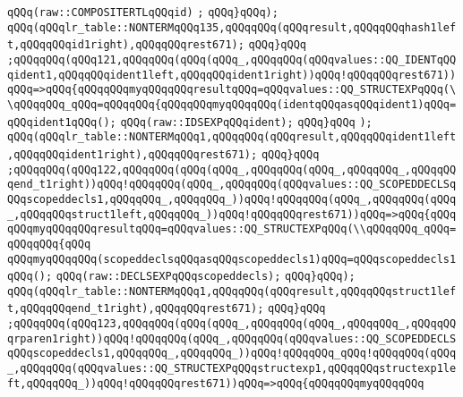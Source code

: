\verb|qQQq(raw::COMPOSITERTLqQQqid)|\newline
\verb|;|\newline
\verb|qQQq}qQQq);|\newline
\verb|qQQq(qQQqlr_table::NONTERMqQQq135,qQQqqQQq(qQQqresult,qQQqqQQqhash1left,qQQqqQQqid1right),qQQqqQQqrest671);|\newline
\verb|qQQq}qQQq|\newline
\verb|;qQQqqQQq(qQQq121,qQQqqQQq(qQQq(qQQq_,qQQqqQQq(qQQqvalues::QQ_IDENTqQQqident1,qQQqqQQqident1left,qQQqqQQqident1right))qQQq!qQQqqQQqrest671))qQQq=>qQQq{qQQqqQQqmyqQQqqQQqresultqQQq=qQQqvalues::QQ_STRUCTEXPqQQq(\\qQQqqQQq_qQQq=qQQqqQQq{qQQqqQQqmyqQQqqQQq(identqQQqasqQQqident1)qQQq=qQQqident1qQQq();|\newline
\verb|qQQq(raw::IDSEXPqQQqident);|\newline
\verb|qQQq}qQQq|\newline
\verb|);|\newline
\verb|qQQq(qQQqlr_table::NONTERMqQQq1,qQQqqQQq(qQQqresult,qQQqqQQqident1left,qQQqqQQqident1right),qQQqqQQqrest671);|\newline
\verb|qQQq}qQQq|\newline
\verb|;qQQqqQQq(qQQq122,qQQqqQQq(qQQq(qQQq_,qQQqqQQq(qQQq_,qQQqqQQq_,qQQqqQQqend_t1right))qQQq!qQQqqQQq(qQQq_,qQQqqQQq(qQQqvalues::QQ_SCOPEDDECLSqQQqscopeddecls1,qQQqqQQq_,qQQqqQQq_))qQQq!qQQqqQQq(qQQq_,qQQqqQQq(qQQq_,qQQqqQQqstruct1left,qQQqqQQq_))qQQq!qQQqqQQqrest671))qQQq=>qQQq{qQQqqQQqmyqQQqqQQqresultqQQq=qQQqvalues::QQ_STRUCTEXPqQQq(\\qQQqqQQq_qQQq=qQQqqQQq{qQQq|\newline
\verb|qQQqmyqQQqqQQq(scopeddeclsqQQqasqQQqscopeddecls1)qQQq=qQQqscopeddecls1qQQq();|\newline
\verb|qQQq(raw::DECLSEXPqQQqscopeddecls);|\newline
\verb|qQQq}qQQq);|\newline
\verb|qQQq(qQQqlr_table::NONTERMqQQq1,qQQqqQQq(qQQqresult,qQQqqQQqstruct1left,qQQqqQQqend_t1right),qQQqqQQqrest671);|\newline
\verb|qQQq}qQQq|\newline
\verb|;qQQqqQQq(qQQq123,qQQqqQQq(qQQq(qQQq_,qQQqqQQq(qQQq_,qQQqqQQq_,qQQqqQQqrparen1right))qQQq!qQQqqQQq(qQQq_,qQQqqQQq(qQQqvalues::QQ_SCOPEDDECLSqQQqscopeddecls1,qQQqqQQq_,qQQqqQQq_))qQQq!qQQqqQQq_qQQq!qQQqqQQq(qQQq_,qQQqqQQq(qQQqvalues::QQ_STRUCTEXPqQQqstructexp1,qQQqqQQqstructexp1left,qQQqqQQq_))qQQq!qQQqqQQqrest671))qQQq=>qQQq{qQQqqQQqmyqQQqqQQq|\newline
